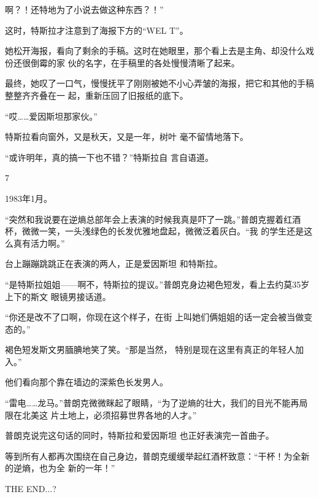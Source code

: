 \documentclass{article}
\begin{document}
\newpage
啊？！还特地为了小说去做这种东西？！” 

这时，特斯拉才注意到了海报下方的“WEL
T”。 

她松开海报，看向了剩余的手稿。这时在她眼里，那个看上去是主角、却没什么戏份还很倒霉的家
伙的名字，在手稿里的各处慢慢清晰了起来。 

最终，她叹了一口气，慢慢抚平了刚刚被她不小心弄皱的海报，把它和其他的手稿整整齐齐叠在一
起，重新压回了旧报纸的底下。 


“哎……爱因斯坦那家伙。” 

特斯拉看向窗外，又是秋天，又是一年，树叶
毫不留情地落下。 

“或许明年，真的搞一下也不错？”特斯拉自
言自语道。 


\newpage

7 


1983年1月。 

“突然和我说要在逆熵总部年会上表演的时候我真是吓了一跳。”普朗克握着红酒杯，微微一笑，一头浅绿色的长发优雅地盘起，微微泛着灰白。“我
的学生还是这么真有活力啊。” 

台上蹦蹦跳跳正在表演的两人，正是爱因斯坦
和特斯拉。 

“是特斯拉姐姐——啊不，特斯拉的提议。”普朗克身边褐色短发，看上去约莫35岁上下的斯文
眼镜男接话道。 

“你还是改不了口啊，你现在这个样子，在街
上叫她们俩姐姐的话一定会被当做变态的。” 

褐色短发斯文男腼腆地笑了笑。“那是当然，
特别是现在这里有真正的年轻人加入。” 

\newpage


他们看向那个靠在墙边的深紫色长发男人。 

“雷电……龙马。”普朗克微微眯起了眼睛，“为了逆熵的壮大，我们的目光不能再局限在北美这
片土地上，必须招募世界各地的人才。” 

普朗克说完这句话的同时，特斯拉和爱因斯坦
也正好表演完一首曲子。 

等到所有人都再次围绕在自己身边，普朗克缓缓举起红酒杯致意：“干杯！为全新的逆熵，也为全
新的一年！” 

THE END...?
\end{document}
